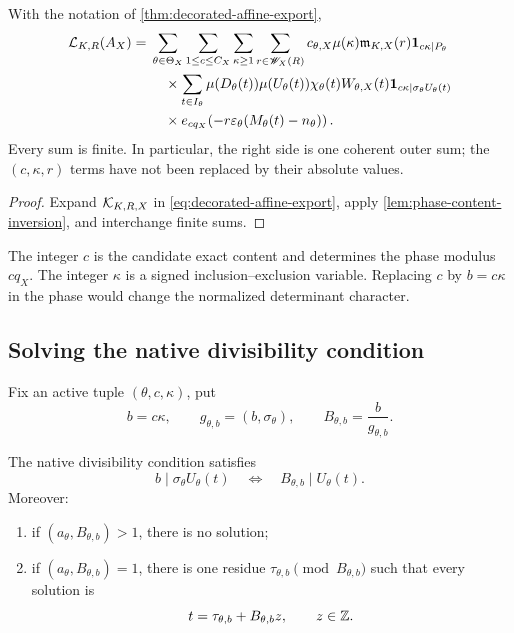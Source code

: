 \begin{theorem}
\label{thm:content-expanded-window}
With the notation of \cref{thm:decorated-affine-export},
\begin{align}
 \mathcal L_{K,R}(A_X)
 ={}&
 \sum_{\theta\in\Theta_X}
 \sum_{1\le c\le C_X}
 \sum_{\kappa\ge1}
 \sum_{r\in\mathscr W_X(R)}
 c_{\theta,X}\mu(\kappa)
 \mathfrak m_{K,X}(r)
 \mathbf 1_{c\kappa\mid P_\theta}
 \notag\\
 &\quad\times
 \sum_{t\in I_\theta}
 \mu(D_\theta(t))\mu(U_\theta(t))
 \chi_\theta(t)W_{\theta,X}(t)
 \mathbf 1_{c\kappa\mid\sigma_\theta U_\theta(t)}
 \notag\\
 &\quad\times
 e_{cq_X}\!\left(
 -r\varepsilon_\theta
 (M_\theta(t)-n_\theta)\right).
\label{eq:content-expanded-window}
\end{align}
Every sum is finite.  In particular, the right side is one coherent
outer sum; the \((c,\kappa,r)\) terms have not been replaced by their
absolute values.
\end{theorem}

\begin{proof}
Expand \(\mathcal K_{K,R,X}\) in
\eqref{eq:decorated-affine-export}, apply
\cref{lem:phase-content-inversion}, and interchange finite sums.
\end{proof}

\begin{remark}
The integer \(c\) is the candidate exact content and determines the
phase modulus \(cq_X\).  The integer \(\kappa\) is a signed
inclusion--exclusion variable.  Replacing \(c\) by
\(b=c\kappa\) in the phase would change the normalized determinant
character.
\end{remark}

\subsection{Solving the native divisibility condition}

Fix an active tuple \((\theta,c,\kappa)\), put
\begin{equation}
 b=c\kappa,\qquad
 g_{\theta,b}=(b,\sigma_\theta),\qquad
 B_{\theta,b}=\frac{b}{g_{\theta,b}}.
\label{eq:progression-B}
\end{equation}

\begin{lemma}
\label{lem:one-progression}
The native divisibility condition satisfies
\begin{equation}
 b\mid\sigma_\theta U_\theta(t)
 \quad\Longleftrightarrow\quad
 B_{\theta,b}\mid U_\theta(t).
\label{eq:progression-divisibility-reduction}
\end{equation}
Moreover:
\begin{enumerate}[label=(\roman*),leftmargin=2.2em]
\item if \((a_\theta,B_{\theta,b})>1\), there is no solution;
\item if \((a_\theta,B_{\theta,b})=1\), there is one residue
\(\tau_{\theta,b}\pmod{B_{\theta,b}}\) such that every solution is
\[
 t=\tau_{\theta,b}+B_{\theta,b}z,\qquad z\in\mathbb Z.
 \]
\end{enumerate}
\end{lemma}

